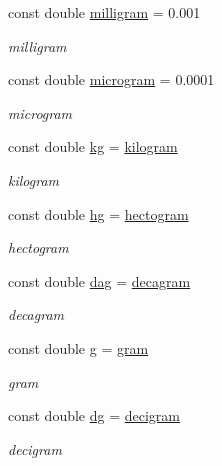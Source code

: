 \begin{DoxyCompactItemize}
const double \hyperlink{namespace_utilities_acad791e8ae3f5eb81fa1aeb7abf90f9f}{milligram} = 0.001
\begin{DoxyCompactList}\small\item\em milligram \end{DoxyCompactList}\item 
const double \hyperlink{namespace_utilities_ab9752f0a0b8174ed273a2a505c2a83e4}{microgram} = 0.0001
\begin{DoxyCompactList}\small\item\em microgram \end{DoxyCompactList}\item 
const double \hyperlink{namespace_utilities_ade5640692129a688db6afa41d15d8778}{kg} = \hyperlink{namespace_utilities_a53892b9a331b44b7edb02383d2d3cc74}{kilogram}
\begin{DoxyCompactList}\small\item\em kilogram \end{DoxyCompactList}\item 
const double \hyperlink{namespace_utilities_afce1fbb55c72d2f7670158b228e6be92}{hg} = \hyperlink{namespace_utilities_a06ccbbfaf687e7c9567fe53a74a815a4}{hectogram}
\begin{DoxyCompactList}\small\item\em hectogram \end{DoxyCompactList}\item 
const double \hyperlink{namespace_utilities_a1a052c7a7614fc92834c71bc8029e0b3}{dag} = \hyperlink{namespace_utilities_a0768cb48610ba03979360e95959f44d9}{decagram}
\begin{DoxyCompactList}\small\item\em decagram \end{DoxyCompactList}\item 
const double \hyperlink{namespace_utilities_afa66a78e61dc36f0bf8236522c1d0495}{g} = \hyperlink{namespace_utilities_a31f2c5ded8f5f13007b4704e0509ce8c}{gram}
\begin{DoxyCompactList}\small\item\em gram \end{DoxyCompactList}\item 
const double \hyperlink{namespace_utilities_a0560b0dea05b99f76fe3209784c11a14}{dg} = \hyperlink{namespace_utilities_a19cffac32ac7c8d1d469398620265431}{decigram}
\begin{DoxyCompactList}\small\item\em decigram \end{DoxyCompactList}\item 

\end{DoxyCompactItemize}
